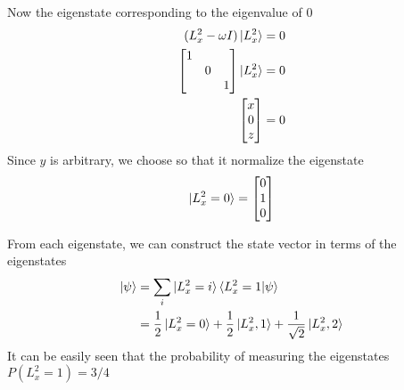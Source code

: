 \documentclass[../../../main.tex]{subfiles}
\begin{document}
Now the eigenstate corresponding to the eigenvalue of 0
\begin{align*}
    (L_x^2-\omega I) \ket{L_x^2} & = 0 \\
    \begin{bmatrix}
        1 &   &   \\
          & 0 &   \\
          &   & 1
    \end{bmatrix}
    \ket{L_x^2}                  & = 0 \\
    \begin{bmatrix}
        x \\0\\z
    \end{bmatrix}
                                 & = 0
\end{align*}
Since $y$ is arbitrary, we choose so that it normalize the eigenstate
\begin{equation*}
    \ket{L_x^2=0}=
    \begin{bmatrix}
        0 \\1\\0
    \end{bmatrix}
\end{equation*}

From each eigenstate, we can construct the state vector in terms of the eigenstates
\begin{align*}
    \ket{\psi } & =  \sum_{i} \ket{L_x^2=i}\braket{L_x^2=1|\psi}                                            \\
                & = \frac{1 }{2 }\ket{L_x^2=0}+\frac{1 }{2 }\ket{L_x^2,1}+\frac{1 }{\sqrt{2 }}\ket{L_x^2,2}
\end{align*}
It can be easily seen that the probability of measuring the eigenstates $P(L_x^2=1)=3/4$
\end{document}
